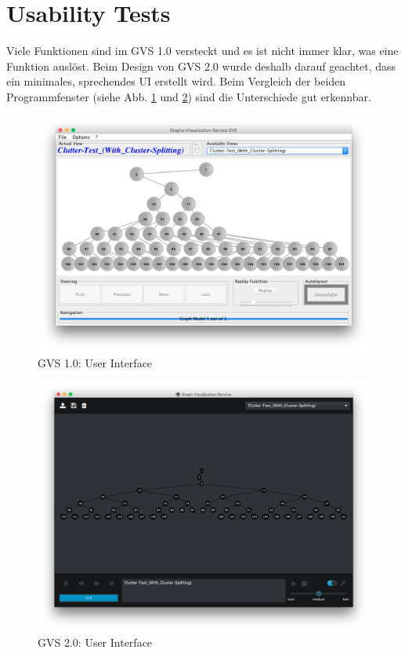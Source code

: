 \documentclass[11pt,a4paper,english,oneside]{book}
\numberwithin{equation}{chapter}
\begin{document}
	\clearpage
	
	
	
	\section{Usability Tests}
	Viele Funktionen sind im GVS 1.0 versteckt und es ist nicht immer klar, was eine Funktion auslöst. Beim Design von GVS 2.0 wurde deshalb darauf geachtet, dass ein minimales, sprechendes UI erstellt wird. Beim Vergleich der beiden Programmfenster (siehe Abb. \ref{fig:gvs-1} und \ref{fig:gvs-2}) sind die Unterschiede gut erkennbar. 
	
	\begin{figure}[h!]
		\centering
		\includegraphics[width=0.6\linewidth]{assets/images/gvs-1}
		\caption{GVS 1.0: User Interface}
		\label{fig:gvs-1}
	\end{figure}

	\begin{figure}[h!]
		\centering
		\includegraphics[width=0.6\linewidth]{assets/images/gvs-2}
		\caption{GVS 2.0: User Interface}
		\label{fig:gvs-2}
	\end{figure}
	
\end{document}
